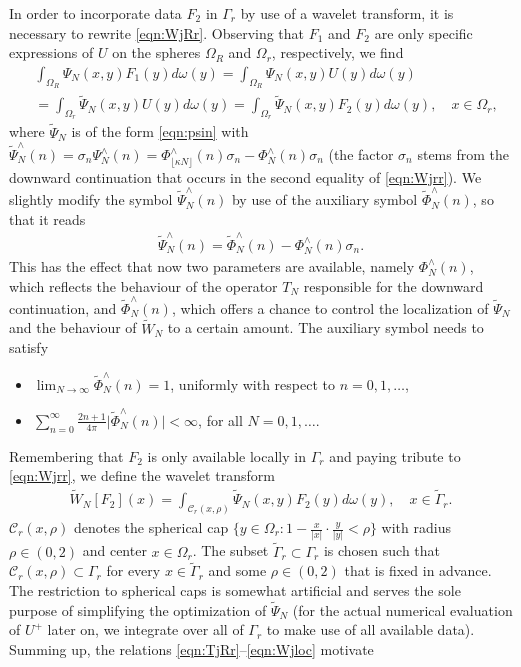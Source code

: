 \documentclass[a4paper, 10pt]{article}
\numberwithin{equation}{section}
\theoremstyle{definition}
\begin{document}
In order to incorporate data $F_2$ in $\Gamma_r$ by use of a wavelet transform, it is necessary to rewrite \eqref{eqn:WjRr}. Observing that $F_1$ and $F_2$ are only specific expressions of $U$ on the spheres $\Omega_R$ and $\Omega_r$, respectively, we find 
\begin{align}\label{eqn:Wjrr}
&\int_{\Omega_R}\Psi_N(x,y) F_1(y)d\omega(y)=\int_{\Omega_R}\Psi_N(x,y) U(y)d\omega(y)
\\&=\int_{\Omega_r}\tilde{\Psi}_N(x,y) U(y)d\omega(y)=\int_{\Omega_r}\tilde{\Psi}_N(x,y) F_2(y)d\omega(y),\quad x\in\Omega_r,\nonumber
\end{align}
where $\tilde{\Psi}_N$ is of the form \eqref{eqn:psin} with  $\tilde{\Psi}_N^\wedge(n)=\sigma_n{\Psi}_N^\wedge(n)=\Phi_{\lfloor\kappa N\rfloor}^\wedge(n)\sigma_n-\Phi_N^\wedge(n)\sigma_n$ (the factor $\sigma_n$ stems from the downward continuation that occurs in the second equality of \eqref{eqn:Wjrr}). We slightly modify the symbol $\tilde{\Psi}_N^\wedge(n)$ by use of the auxiliary symbol $\tilde{\Phi}_N^\wedge(n)$, so that it reads  
\begin{align}
{\tilde{\Psi}_N^\wedge(n)=\tilde{\Phi}_N^\wedge(n)-\Phi_N^\wedge(n)\sigma_n.}
\end{align}
This has the effect that now two parameters are available, namely $\Phi_N^\wedge(n)$, which reflects the behaviour of the operator $T_N$ responsible for the downward continuation, and $\tilde{\Phi}_N^\wedge(n)$, which offers a chance to control the localization of $\tilde{\Psi}_N$ and the behaviour of $\tilde{W}_N$ to a certain amount. The auxiliary symbol needs to satisfy
\begin{itemize}
\item[(a')] $\lim_{N\to\infty}\tilde{\Phi}_N^\wedge(n)=1$, uniformly with respect to $n=0,1,\ldots$,
\item[(b')] $\sum_{n=0}^\infty \frac{2n+1}{4\pi} \big|\tilde{\Phi}_N^\wedge(n)\big|< \infty$,  for all $N=0,1,\ldots$.
\end{itemize}
Remembering that $F_2$ is only available locally in $\Gamma_r$ and paying tribute to \eqref{eqn:Wjrr}, we define the wavelet transform 
\begin{align}\label{eqn:Wjloc}
{\tilde{W}_N[F_2](x)=\int_{\mathcal{C}_r(x,\rho)}\tilde{\Psi}_N(x,y) F_2(y)d\omega(y),\quad x\in\tilde{\Gamma}_r.}
\end{align}
$\mathcal{C}_r(x,\rho)$ denotes the spherical cap $\{y\in\Omega_r:1-\frac{x}{|x|}\cdot\frac{y}{|y|}<\rho\}$ with radius $\rho\in(0,2)$ and center $x\in\Omega_r$. The subset $\tilde{\Gamma}_r\subset\Gamma_r$ is chosen such that $\mathcal{C}_r(x,\rho)\subset\Gamma_r$ for every $x\in\tilde{\Gamma}_r$ and some $\rho\in(0,2)$ that is fixed in advance. The restriction to spherical caps is somewhat artificial and serves the sole purpose of simplifying the optimization of $\tilde{\Psi}_N$ (for the actual numerical evaluation of $U^+$ later on, we integrate over all of $\Gamma_r$ to make use of all available data). Summing up, the relations \eqref{eqn:TjRr}--\eqref{eqn:Wjloc} motivate
\end{document}
